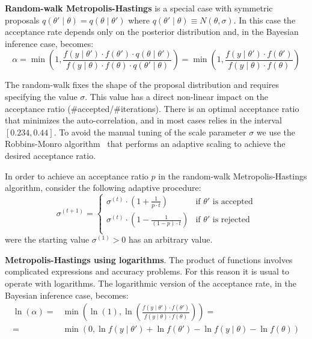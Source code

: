 \documentclass[11pt,fleqn]{book} %
\begin{document}
\textbf{Random-walk Metropolis-Hastings} is a special case with symmetric 
proposals $q(\theta' \mid \theta) = q(\theta \mid \theta')$ where 
$q(\theta' \mid \theta) \equiv N(\theta,\sigma)$. 
In this case the acceptance rate depends only on the posterior distribution
and, in the Bayesian inference case, becomes:
\begin{displaymath}
	\alpha = 
	\min\left(1,\frac{f(y \mid \theta') \cdot f(\theta') \cdot q(\theta \mid \theta')}{f(y \mid \theta)  \cdot f(\theta) \cdot q(\theta' \mid \theta)}\right) = 
	\min\left(1,\frac{f(y \mid \theta') \cdot f(\theta')}{f(y \mid \theta) \cdot f(\theta)}\right)
\end{displaymath}

The random-walk fixes the shape of the proposal distribution and requires 
specifying the value $\sigma$. This value has a direct non-linear impact 
on the acceptance ratio (\#accepted/\#iterations). There is an optimal 
acceptance ratio that minimizes the auto-correlation, and in most cases 
relies in the interval $[0.234,0.44]$. To avoid the  manual tuning of the 
scale parameter $\sigma$ we use the Robbins-Monro algorithm~\cite{garthwaite:2010} 
that performs an adaptive scaling to achieve the desired acceptance ratio.

\begin{proposition}
	In order to achieve an acceptance ratio $p$ in the random-walk 
	Metropolis-Hastings algorithm, consider the following adaptive
	procedure:
	\begin{displaymath}
		\sigma^{(t+1)} = \left\{
		\begin{array}{ll}
			\sigma^{(t)} \cdot \left( 1 + \frac{1}{p \cdot t} \right) & \text{if $\theta'$ is accepted} \\
			\sigma^{(t)} \cdot \left( 1 - \frac{1}{(1-p) \cdot t} \right) & \text{if $\theta'$ is rejected} \\
		\end{array}
		\right.
	\end{displaymath}
	were the starting value $\sigma^{(1)} > 0$ has an arbitrary value.
\end{proposition}

\textbf{Metropolis-Hastings using logarithms}.
The product of functions involves complicated expressions and accuracy 
problems. For this reason it is usual to operate with logarithms. The 
logarithmic version of the acceptance rate, in the Bayesian inference 
case, becomes:
\begin{displaymath}
	\begin{array}{rl}
		\ln(\alpha) = & \min \left( \ln(1),  
		\ln \left(\frac{f(y \mid \theta') \cdot f(\theta')}{f(y \mid \theta) \cdot f(\theta)}\right)
		\right) = \\
		= & \min \left( 0,
		\ln f(y \mid \theta') + \ln f(\theta') - \ln f(y \mid \theta) - \ln f(\theta)
		\right)
	\end{array}
\end{displaymath}
\end{document}
